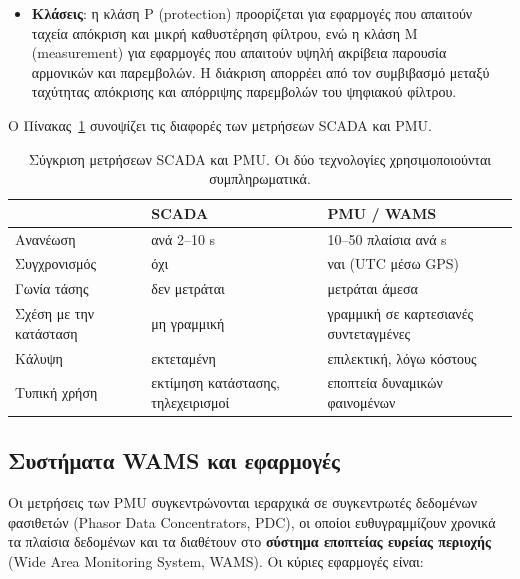 \begin{itemize}
\item \textbf{Κλάσεις}: η κλάση P (protection) προορίζεται για εφαρμογές που απαιτούν ταχεία
      απόκριση και μικρή καθυστέρηση φίλτρου, ενώ η κλάση M (measurement) για εφαρμογές
      που απαιτούν υψηλή ακρίβεια παρουσία αρμονικών και παρεμβολών. Η διάκριση απορρέει
      από τον συμβιβασμό μεταξύ ταχύτητας απόκρισης και απόρριψης παρεμβολών του
      ψηφιακού φίλτρου.
\end{itemize}

Ο Πίνακας~\ref{tab:scada-pmu} συνοψίζει τις διαφορές των μετρήσεων SCADA και PMU.

\begin{table}[!htbp]
\centering
\begin{tabular}{lll}
\hline
 & SCADA & PMU / WAMS \\
\hline
Ανανέωση         & ανά 2--10 s        & 10--50 πλαίσια ανά s \\
Συγχρονισμός     & όχι                & ναι (UTC μέσω GPS) \\
Γωνία τάσης      & δεν μετράται       & μετράται άμεσα \\
Σχέση με την κατάσταση & μη γραμμική & γραμμική σε καρτεσιανές συντεταγμένες \\
Κάλυψη           & εκτεταμένη         & επιλεκτική, λόγω κόστους \\
Τυπική χρήση     & εκτίμηση κατάστασης, τηλεχειρισμοί & εποπτεία δυναμικών φαινομένων \\
\hline
\end{tabular}
\caption{Σύγκριση μετρήσεων SCADA και PMU. Οι δύο τεχνολογίες χρησιμοποιούνται
συμπληρωματικά.}
\label{tab:scada-pmu}
\end{table}

\subsection{Συστήματα WAMS και εφαρμογές}

Οι μετρήσεις των PMU συγκεντρώνονται ιεραρχικά σε συγκεντρωτές δεδομένων φασιθετών (Phasor
Data Concentrators, PDC), οι οποίοι ευθυγραμμίζουν χρονικά τα πλαίσια δεδομένων και τα
διαθέτουν στο \textbf{σύστημα εποπτείας ευρείας περιοχής} (Wide Area Monitoring System,
WAMS). Οι κύριες εφαρμογές είναι:

